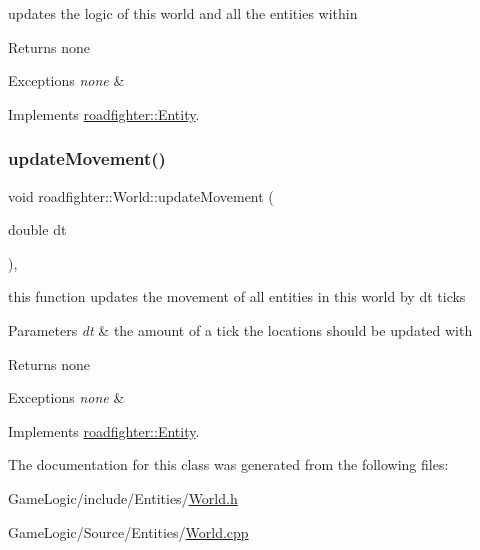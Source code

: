 updates the logic of this world and all the entities within \begin{DoxyReturn}{Returns}
none 
\end{DoxyReturn}

\begin{DoxyExceptions}{Exceptions}
{\em none} & \\
\hline
\end{DoxyExceptions}


Implements \hyperlink{classroadfighter_1_1Entity_a54c00f1af306290bae3e4b84e196566b}{roadfighter\+::\+Entity}.

\mbox{\label{classroadfighter_1_1World_a880776b589376b1b4fd5ed4f26de4482}} 
\subsubsection{\texorpdfstring{update\+Movement()}{updateMovement()}}
{\footnotesize\ttfamily void roadfighter\+::\+World\+::update\+Movement (\begin{DoxyParamCaption}\item[{double}]{dt }\end{DoxyParamCaption})\hspace{0.3cm}{\ttfamily [override]}, {\ttfamily [virtual]}}

this function updates the movement of all entities in this world by dt ticks 
\begin{DoxyParams}{Parameters}
{\em dt} & the amount of a tick the locations should be updated with \\
\hline
\end{DoxyParams}
\begin{DoxyReturn}{Returns}
none 
\end{DoxyReturn}

\begin{DoxyExceptions}{Exceptions}
{\em none} & \\
\hline
\end{DoxyExceptions}


Implements \hyperlink{classroadfighter_1_1Entity_a66614a11004d6f9516473f60b530f689}{roadfighter\+::\+Entity}.



The documentation for this class was generated from the following files\+:\begin{DoxyCompactItemize}
\item 
Game\+Logic/include/\+Entities/\hyperlink{World_8h}{World.\+h}\item 
Game\+Logic/\+Source/\+Entities/\hyperlink{World_8cpp}{World.\+cpp}\end{DoxyCompactItemize}
